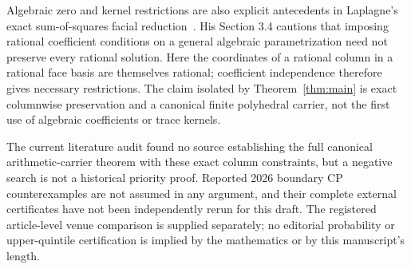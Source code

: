 Algebraic zero and kernel restrictions are also explicit antecedents in Laplagne's exact sum-of-squares facial reduction~\cite{Laplagne}. His Section 3.4 cautions that imposing rational coefficient conditions on a general algebraic parametrization need not preserve every rational solution. Here the coordinates of a rational column in a rational face basis are themselves rational; coefficient independence therefore gives necessary restrictions. The claim isolated by Theorem~\ref{thm:main} is exact columnwise preservation and a canonical finite polyhedral carrier, not the first use of algebraic coefficients or trace kernels.

The current literature audit found no source establishing the full canonical arithmetic-carrier theorem with these exact column constraints, but a negative search is not a historical priority proof. Reported 2026 boundary CP counterexamples are not assumed in any argument, and their complete external certificates have not been independently rerun for this draft. The registered article-level venue comparison is supplied separately; no editorial probability or upper-quintile certification is implied by the mathematics or by this manuscript's length.

